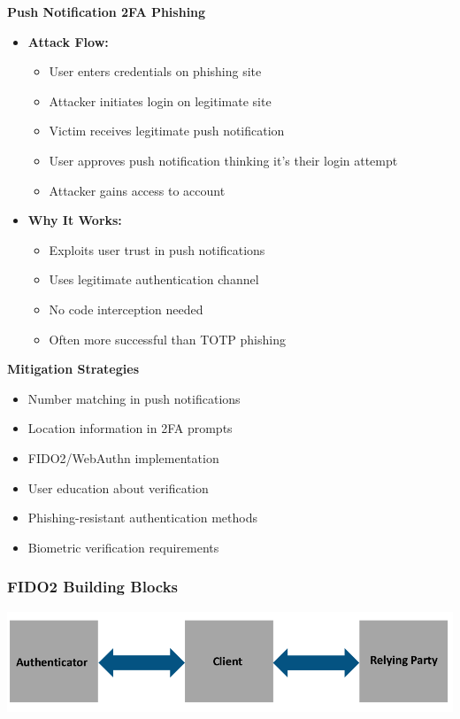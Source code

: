 \textbf{Push Notification 2FA Phishing}
\begin{itemize}
    \item \textbf{Attack Flow:}
        \begin{itemize}
            \item User enters credentials on phishing site
            \item Attacker initiates login on legitimate site
            \item Victim receives legitimate push notification
            \item User approves push notification thinking it's their login attempt
            \item Attacker gains access to account
        \end{itemize}
    \item \textbf{Why It Works:}
        \begin{itemize}
            \item Exploits user trust in push notifications
            \item Uses legitimate authentication channel
            \item No code interception needed
            \item Often more successful than TOTP phishing
        \end{itemize}
\end{itemize}

\textbf{Mitigation Strategies}
\begin{itemize}
    \item Number matching in push notifications
    \item Location information in 2FA prompts
    \item FIDO2/WebAuthn implementation
    \item User education about verification
    \item Phishing-resistant authentication methods
    \item Biometric verification requirements
\end{itemize}

\subsubsection{FIDO2 Building Blocks}
\begin{center}
  \includegraphics[width=\textwidth]{resources/07-mitm-mitigation-fido2.png}
\end{center}

